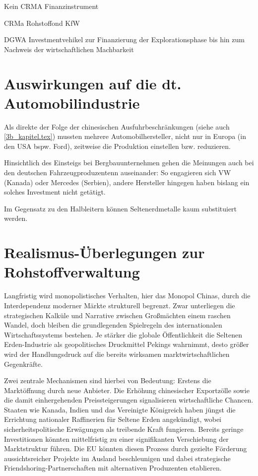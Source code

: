 \documentclass[12pt,a4paper,oneside]{book} %
\begin{document}
Kein CRMA Finanzinstrument

CRMa Rohstoffond KfW

DGWA Investmentvehikel zur Finanzierung der Explorationsphase bis hin zum Nachweis der wirtschaftlichen Machbarkeit

\section{Auswirkungen auf die dt. Automobilindustrie}



Als direkte der Folge der chinesischen Ausfuhrbeschränkungen (siehe auch \ref{3b_kapitel.tex}) mussten mehrere Automobilhersteller, nicht nur in Europa (in den USA bspw. Ford\autocite{Naughton_Bloomberg}), zeitweise die Produktion einstellen bzw. reduzieren.

Hinsichtlich des Einsteigs bei Bergbauunternehmen gehen die Meinungen auch bei den deutschen Fahrzeugproduzentenn auseinander: So engagieren sich VW (Kanada) oder Mercedes (Serbien), andere Hersteller hingegen haben bislang ein solches Investment nicht getätigt.

Im Gegensatz zu den Halbleitern können Seltenerdmetalle kaum substituiert werden.

\section{Realismus-Überlegungen zur Rohstoffverwaltung}

Langfristig wird monopolistisches Verhalten, hier das Monopol Chinas, durch die Interdependenz moderner Märkte strukturell begrenzt. Zwar unterliegen die strategischen Kalküle und Narrative zwischen Großmächten einem raschen Wandel, doch bleiben die grundlegenden Spielregeln des internationalen Wirtschaftssystems bestehen. Je stärker die globale Öffentlichkeit die Seltenen Erden-Industrie als geopolitisches Druckmittel Pekings wahrnimmt, desto größer wird der Handlungsdruck auf die bereits wirksamen marktwirtschaftlichen Gegenkräfte.

Zwei zentrale Mechanismen sind hierbei von Bedeutung: Erstens die Marktöffnung durch neue Anbieter. Die Erhöhung chinesischer Exportzölle sowie die damit einhergehenden Preissteigerungen signalisieren wirtschaftliche Chancen. Staaten wie Kanada, Indien und das Vereinigte Königreich haben jüngst die Errichtung nationaler Raffinerien für Seltene Erden angekündigt, wobei sicherheitspolitische Erwägungen als treibende Kraft fungieren. Bereits geringe Investitionen könnten mittelfristig zu einer signifikanten Verschiebung der Marktstruktur führen. Die EU könnten diesen Prozess durch gezielte Förderung aussichtsreicher Projekte im Ausland beschleunigen und dabei strategische Friendshoring-Partnerschaften mit alternativen Produzenten etablieren.
\end{document}
